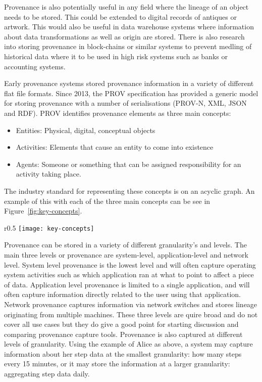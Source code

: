 Provenance is also potentially useful in any field where the lineage of an object needs to be stored. This could be extended to digital records of antiques or artwork. This would also be useful in data warehouse systems where information about data transformations as well as origin are stored. There is also research into storing provenance in
block-chains or similar systems to prevent medling of historical data where it to be used in high risk systems such as banks or accounting systems.

Early provenance systems stored provenance information in a variety of different flat
file formats. Since 2013, the PROV specification has provided a generic model for storing provenance with a number of serialisations (PROV-N, XML, JSON and RDF). PROV identifies provenance elements as three main concepts:

\begin{itemize}
	\item Entities: Physical, digital, conceptual objects
	\item Activities: Elements that cause an entity to come into existence
	\item Agents: Someone or something that can be assigned responsibility for an activity taking place.
\end{itemize}

The industry standard for representing these concepts is on an acyclic graph. An example of this with each of the three main concepts can be see in Figure~\ref{fig:key-concepts}.

\begin{wrapfigure}{r}{0.5\textwidth}
	\centering
	\texttt{[image: key-concepts]}
	\caption{Key Concepts and relationships from the PROV standard displayed in a labelled acyclic graph.}
	\label{fig:key-concepts}
\end{wrapfigure}

Provenance can be stored in a variety of different granularity's and levels. The main three levels or provenance are system-level, application-level and network level. System level provenance is the lowest level and will often capture operating system activities such as which application ran at what to point to affect a piece of data. Application level provenance is limited to a single application, and will often capture information directly related to the user using that application. Network provenance captures information via network switches and stores lineage originating from multiple machines. These three levels are quire broad and do not cover all use cases but they do give a good point for starting discussion and comparing provenance capture tools. Provenance is also captured at different levels of granularity. Using the example of Alice as above, a system may capture information about her step data at the smallest granularity: how many steps every 15 minutes, or it may store the information at a larger granularity: aggregating step data daily.

